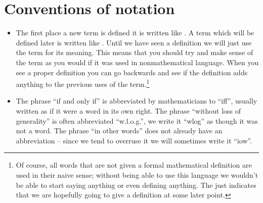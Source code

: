 \chapter{Conventions of notation}
\label{notation}

\begin{itemize}
\item
The first place a new term is defined it is written like . A term which will be defined later is written like . Until we have seen a definition we will just use the term for its  meaning. This means that you should try and make sense of the term as you would if it was used in nonmathematical language. When you see a proper definition you can go backwards and see if the definition adds anything to the previous uses of the term.\footnote{Of course, all words that are not given a formal mathematical definition are used in their naive sense; without being able to use this language we wouldn't be able to start saying anything or even defining anything. The  just indicates that we are hopefully going to give a definition at some later point.}
\item
The phrase ``if and only if'' is abbreviated by mathematicians to ``iff'', usually written as if it were a word in its own right. The phrase ``without loss of generality'' is often abbreviated ``w.l.o.g.'', we write it ``wlog'' as though it was not a word. The phrase ``in other words'' does not already have an abbreviation -- since we tend to overruse it we will sometimes write it ``iow''.
\end{itemize}
